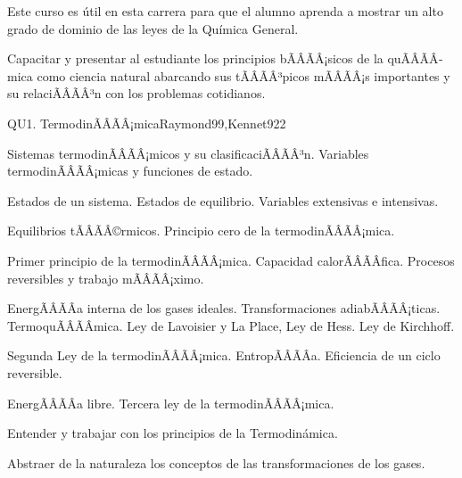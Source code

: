 \begin{sumilla}


\begin{fundamentacion}
Este curso es \'util en esta carrera para que el alumno aprenda a mostrar un alto grado de dominio de las leyes de la Qu\'imica General.
\end{fundamentacion}

\begin{objetivosdelcurso}
\item Capacitar y presentar al estudiante los principios bÃÂÃÂ¡sicos de la quÃÂÃÂ­mica como ciencia natural abarcando sus tÃÂÃÂ³picos mÃÂÃÂ¡s importantes y su relaciÃÂÃÂ³n con los problemas cotidianos.
\end{objetivosdelcurso}

\begin{outcomes}
\end{outcomes}

\begin{unit}{QU1. TermodinÃÂÃÂ¡mica}{Raymond99,Kennet92}{2}
\begin{topicos}
      \item Sistemas termodinÃÂÃÂ¡micos y su clasificaciÃÂÃÂ³n. Variables termodinÃÂÃÂ¡micas y funciones de estado.
      \item Estados de un sistema. Estados de equilibrio. Variables extensivas e intensivas.
      \item Equilibrios tÃÂÃÂ©rmicos. Principio cero de la termodinÃÂÃÂ¡mica.
      \item Primer principio de la termodinÃÂÃÂ¡mica. Capacidad calorÃÂÃÂ­fica. Procesos reversibles y trabajo mÃÂÃÂ¡ximo.
      \item EnergÃÂÃÂ­a interna de los gases ideales. Transformaciones adiabÃÂÃÂ¡ticas. TermoquÃÂÃÂ­mica. Ley de Lavoisier y La Place, Ley de Hess. Ley de Kirchhoff.
      \item Segunda Ley de la termodinÃÂÃÂ¡mica. EntropÃÂÃÂ­a. Eficiencia de un ciclo reversible.
	\item EnergÃÂÃÂ­a libre. Tercera ley de la termodinÃÂÃÂ¡mica.
   \end{topicos}

   \begin{objetivos}
      \item Entender y trabajar con los principios de la Termodin\'amica.
      \item Abstraer de la naturaleza los conceptos de las transformaciones de los gases.
   \end{objetivos}
\end{unit}


\end{sumilla}
